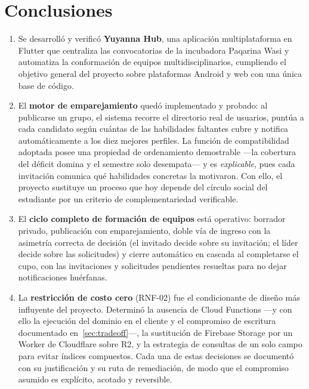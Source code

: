 \documentclass[12pt,a4paper]{article}
\begin{document}
\newpage
\section{Conclusiones}

\begin{enumerate}
    \item Se desarrolló y verificó \textbf{Yuyanna Hub}, una aplicación multiplataforma en Flutter que centraliza las convocatorias de la incubadora Paqarina Wasi y automatiza la conformación de equipos multidisciplinarios, cumpliendo el objetivo general del proyecto sobre plataformas Android y web con una única base de código.

    \item El \textbf{motor de emparejamiento} quedó implementado y probado: al publicarse un grupo, el sistema recorre el directorio real de usuarios, puntúa a cada candidato según cuántas de las habilidades faltantes cubre y notifica automáticamente a los diez mejores perfiles. La función de compatibilidad adoptada posee una propiedad de ordenamiento demostrable ---la cobertura del déficit domina y el semestre solo desempata--- y es \emph{explicable}, pues cada invitación comunica qué habilidades concretas la motivaron. Con ello, el proyecto sustituye un proceso que hoy depende del círculo social del estudiante por un criterio de complementariedad verificable.

    \item El \textbf{ciclo completo de formación de equipos} está operativo: borrador privado, publicación con emparejamiento, doble vía de ingreso con la asimetría correcta de decisión (el invitado decide sobre su invitación; el líder decide sobre las solicitudes) y cierre automático en cascada al completarse el cupo, con las invitaciones y solicitudes pendientes resueltas para no dejar notificaciones huérfanas.

    \item La \textbf{restricción de costo cero} (RNF-02) fue el condicionante de diseño más influyente del proyecto. Determinó la ausencia de Cloud Functions ---y con ello la ejecución del dominio en el cliente y el compromiso de escritura documentado en~\ref{sec:tradeoff}---, la sustitución de Firebase Storage por un Worker de Cloudflare sobre R2, y la estrategia de consultas de un solo campo para evitar índices compuestos. Cada una de estas decisiones se documentó con su justificación y su ruta de remediación, de modo que el compromiso asumido es explícito, acotado y reversible.


\end{enumerate}
\end{document}
